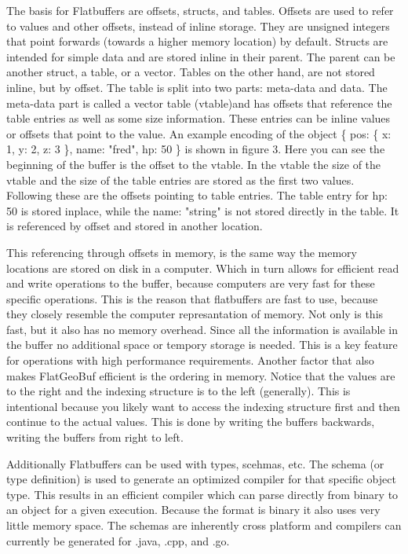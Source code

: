 The basis for Flatbuffers are offsets, structs, and tables. Offsets are used to refer to values and other offsets, instead of inline storage. They are unsigned integers that point forwards (towards a higher memory location) by default. Structs are intended for simple data and are stored inline in their parent. The parent can be another struct, a table, or a vector. Tables on the other hand, are not stored inline, but by offset. The table is split into two parts: meta-data and data. The meta-data part is called a vector table (vtable)and has offsets that reference the table entries as well as some size information. These entries can be inline values or offsets that point to the value. An example encoding of the object \{ pos: \{ x: 1, y: 2, z: 3 \}, name: "fred", hp: 50 \} is shown in figure 3. Here you can see the beginning of the buffer is the offset to the vtable. In the vtable the size of the vtable and the size of the table entries are stored as the first two values. Following these are the offsets pointing to table entries. The table entry for hp: 50 is stored inplace, while the name: "string" is not stored directly in the table. It is referenced by offset and stored in another location.

This referencing through offsets in memory, is the same way the memory locations are stored on disk in a computer. Which in turn allows for efficient read and write operations to the buffer, because computers are very fast for these specific operations. This is the reason that flatbuffers are fast to use, because they closely resemble the computer represantation of memory. Not only is this fast, but it also has no memory overhead. Since all the information is available in the buffer no additional space or tempory storage is needed. This is a key feature for operations with high performance requirements. Another factor that also makes FlatGeoBuf efficient is the ordering in memory. Notice that the values are to the right and the indexing structure is to the left (generally). This is intentional because you likely want to access the indexing structure first and then continue to the actual values. This is done by writing the buffers backwards, writing the buffers from right to left.

Additionally Flatbuffers can be used with types, scehmas, etc. The schema (or type definition) is used to generate an optimized compiler for that specific object type. This results in an efficient compiler which can parse directly from binary to an object for a given execution. Because the format is binary it also uses very little memory space. The schemas are inherently cross platform and compilers can currently be generated for .java, .cpp, and .go.

